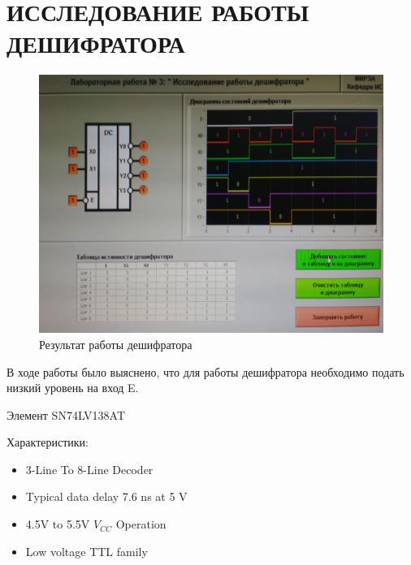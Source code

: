 \section{ИССЛЕДОВАНИЕ РАБОТЫ ДЕШИФРАТОРА}

\begin{figure}[H]
	\centering
	\includegraphics[width=0.95\linewidth]{imgs/3/1}
	\caption{Результат работы дешифратора}
	\label{fig:3_}
\end{figure}

В ходе работы было выяснено, что для работы дешифратора необходимо подать низкий уровень на вход E.

Элемент SN74LV138AT

Характеристики:
\begin{itemize}
	\item 3-Line To 8-Line Decoder
	\item Typical data delay 7.6 ns at 5 V
	\item 4.5V to 5.5V $V_{CC}$ Operation
	\item Low voltage TTL family
\end{itemize}